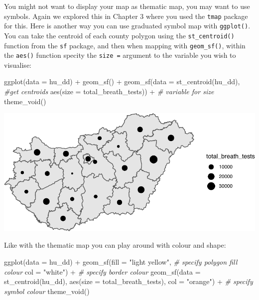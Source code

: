 \documentclass[
  krantz2]{krantz}
\makeatletter
\newenvironment{Shaded}{\begin{snugshade}}{\end{snugshade}}
\newcommand{\AttributeTok}[1]{\textcolor[rgb]{0.61,0.61,0.61}{#1}}
\newcommand{\CommentTok}[1]{\textcolor[rgb]{0.37,0.37,0.37}{\textit{#1}}}
\newcommand{\FunctionTok}[1]{\textcolor[rgb]{0,0,0}{#1}}
\newcommand{\NormalTok}[1]{#1}
\newcommand{\SpecialCharTok}[1]{\textcolor[rgb]{0,0,0}{#1}}
\newcommand{\StringTok}[1]{\textcolor[rgb]{0.5,0.5,0.5}{#1}}
\newenvironment{kframe}{%
\medskip{}
\setlength{\fboxsep}{.8em}
 \def\at@end@of@kframe{}%
 \ifinner\ifhmode%
  \def\at@end@of@kframe{\end{minipage}}%
  \begin{minipage}{\columnwidth}%
 \fi\fi%
 \def\FrameCommand##1{\hskip\@totalleftmargin \hskip-\fboxsep
 \colorbox{shadecolor}{##1}\hskip-\fboxsep
     \hskip-\linewidth \hskip-\@totalleftmargin \hskip\columnwidth}%
 \MakeFramed {\advance\hsize-\width
   \@totalleftmargin\z@ \linewidth\hsize
   \@setminipage}}%
 {\par\unskip\endMakeFramed%
 \at@end@of@kframe}
\renewenvironment{Shaded}{\begin{kframe}}{\end{kframe}}
\makeatother
\begin{document}
You might not want to display your map as thematic map, you may want to use symbols. Again we explored this in Chapter 3 where you used the \texttt{tmap} package for this. Here is another way you can use graduated symbol map with \texttt{ggplot()}. You can take the centroid of each county polygon using the \texttt{st\_centroid()} function from the \texttt{sf} package, and then when mapping with \texttt{geom\_sf()}, within the \texttt{aes()} function specity the \texttt{size\ =} argument to the variable you wish to visualise:

\begin{Shaded}
\begin{Highlighting}[]
\FunctionTok{ggplot}\NormalTok{(}\AttributeTok{data =}\NormalTok{ hu\_dd) }\SpecialCharTok{+} 
  \FunctionTok{geom\_sf}\NormalTok{() }\SpecialCharTok{+} 
  \FunctionTok{geom\_sf}\NormalTok{(}\AttributeTok{data =} \FunctionTok{st\_centroid}\NormalTok{(hu\_dd),  }\CommentTok{\#get centroids}
          \FunctionTok{aes}\NormalTok{(}\AttributeTok{size =}\NormalTok{ total\_breath\_tests)) }\SpecialCharTok{+}  \CommentTok{\# variable for size}
  \FunctionTok{theme\_void}\NormalTok{()}
\end{Highlighting}
\end{Shaded}

\includegraphics{crime_mapping_files/figure-latex/gradsymbmap-1.pdf}

Like with the thematic map you can play around with colour and shape:

\begin{Shaded}
\begin{Highlighting}[]
\FunctionTok{ggplot}\NormalTok{(}\AttributeTok{data =}\NormalTok{ hu\_dd) }\SpecialCharTok{+} 
  \FunctionTok{geom\_sf}\NormalTok{(}\AttributeTok{fill =} \StringTok{"light yellow"}\NormalTok{,   }\CommentTok{\# specify polygon fill colour}
          \AttributeTok{col =} \StringTok{"white"}\NormalTok{) }\SpecialCharTok{+}    \CommentTok{\# specify border colour}
  \FunctionTok{geom\_sf}\NormalTok{(}\AttributeTok{data =} \FunctionTok{st\_centroid}\NormalTok{(hu\_dd), }
          \FunctionTok{aes}\NormalTok{(}\AttributeTok{size =}\NormalTok{ total\_breath\_tests), }
          \AttributeTok{col =} \StringTok{"orange"}\NormalTok{) }\SpecialCharTok{+}  \CommentTok{\# specify symbol colour}
  \FunctionTok{theme\_void}\NormalTok{()}
\end{Highlighting}
\end{Shaded}
\end{document}
